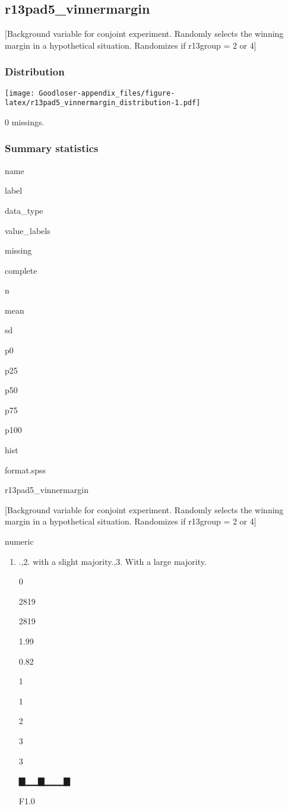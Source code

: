 \documentclass[]{book}
\providecommand{\tightlist}{%
  \setlength{\itemsep}{0pt}\setlength{\parskip}{0pt}}
\begin{document}
\subsection{r13pad5\_vinnermargin}\label{r13pad5_vinnermargin}

{[}Background variable for conjoint experiment. Randomly selects the
winning margin in a hypothetical situation. Randomizes if r13group = 2
or 4{]}

\subsubsection{Distribution}\label{r13pad5_vinnermargin_distribution}

\texttt{[image: Goodloser-appendix\_files/figure-latex/r13pad5\_vinnermargin\_distribution-1.pdf]}

0 missings.

\subsubsection{Summary statistics}\label{r13pad5_vinnermargin_summary}

name

label

data\_type

value\_labels

missing

complete

n

mean

sd

p0

p25

p50

p75

p100

hist

format.spss

r13pad5\_vinnermargin

{[}Background variable for conjoint experiment. Randomly selects the
winning margin in a hypothetical situation. Randomizes if r13group = 2
or 4{]}

numeric

\begin{enumerate}
\def\labelenumi{\arabic{enumi}.}
\tightlist
\item
  .,2. with a slight majority.,3. With a large majority.

  0

  2819

  2819

  1.99

  0.82

  1

  1

  2

  3

  3

  ▇▁▁▇▁▁▁▇

  F1.0
\end{enumerate}
\end{document}
